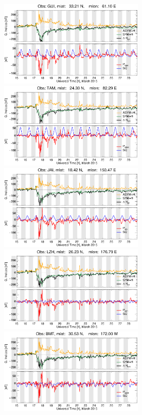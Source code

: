 \documentclass[a4paper]{article}
\theoremstyle{plain}
\theoremstyle{definition}
\begin{document}
	
\begin{figure}
	\centering
	\includegraphics[width=7.0cm]{fig/magdata/gui_2015-03-15_2015-03-28.eps}   
	\includegraphics[width=7.0cm]{fig/magdata/tam_2015-03-15_2015-03-28.eps} 
	\includegraphics[width=7.0cm]{fig/magdata/jai_2015-03-15_2015-03-28.eps}  
	\includegraphics[width=7.0cm]{fig/magdata/lzh_2015-03-15_2015-03-28.eps}
	\includegraphics[width=7.0cm]{fig/magdata/bmt_2015-03-15_2015-03-28.eps}

\end{figure}
\end{document}
